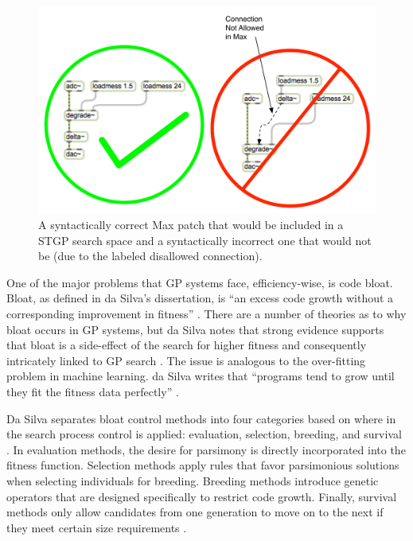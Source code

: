 \documentclass[12pt]{report} 	%
\numberwithin{figure}{chapter}
\numberwithin{table}{chapter}
\numberwithin{equation}{chapter}
\begin{document}
\begin{flushleft}
\begin{figure}[h!]
\begin{center}
\vspace{24pt}
\includegraphics[scale=0.70]{SyntacticCorrectness}
\caption[Strongly-typed genetic programming]{A syntactically correct Max patch that would be included in a STGP search space and a syntactically incorrect one that would not be (due to the labeled disallowed connection).}
\end{center}
\vspace{6pt}
\end{figure}
One of the major problems that GP systems face, efficiency-wise, is code bloat. Bloat, as defined in da Silva's dissertation, is ``an excess code growth without a corresponding improvement in fitness'' \cite[p. 2]{Silva:2008le}. There are a number of theories as to why bloat occurs in GP systems, but da Silva notes that strong evidence supports that bloat is a side-effect of the search for higher fitness and consequently intricately linked to GP search \cite[p. 9]{Silva:2008le}. The issue is analogous to the over-fitting problem in machine learning. da Silva writes that ``programs tend to grow until they fit the fitness data perfectly'' \cite[p. 9]{Silva:2008le}.

Da Silva separates bloat control methods into four categories based on where in the search process control is applied: evaluation, selection, breeding, and survival \cite[p. 11]{Silva:2008le}. In evaluation methods, the desire for parsimony is directly incorporated into the fitness function. Selection methods apply rules that favor parsimonious solutions when selecting individuals for breeding. Breeding methods introduce genetic operators that are designed specifically to restrict code growth. Finally, survival methods only allow candidates from one generation to move on to the next if they meet certain size requirements \cite[p. 11-12]{Silva:2008le}. 


\end{flushleft}
\end{document}

